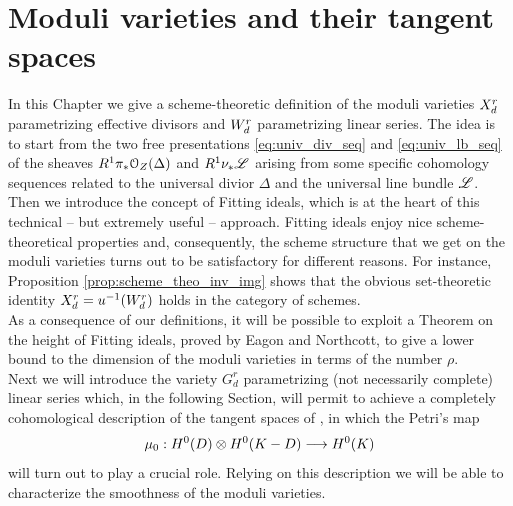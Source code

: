 
\chapter{Moduli varieties and their tangent spaces}\label{chap:moduli}



\ifpdf
    \graphicspath{{figures/PNG/}{figures/}{figures/}}
\else
    \graphicspath{{figures/EPS/}{figures/}}
\fi



In this Chapter we give a scheme-theoretic definition of the moduli varieties $X_d^r$ parametrizing effective divisors and $W_d^r$ parametrizing linear series. The idea is to start from the two free presentations \eqref{eq:univ_div_seq} and \eqref{eq:univ_lb_seq} of the sheaves $R^1 \pi_* \mathcal{O}_Z(\Delta)$ and $R^1 \nu_{*} \mathscr{L}$ arising from some specific cohomology sequences related to the universal divior $\Delta$ and the universal line bundle $\mathscr{L}$.\\
Then we introduce the concept of Fitting ideals, which is at the heart of this technical -- but extremely useful -- approach. Fitting ideals enjoy nice scheme-theoretical properties and, consequently, the scheme structure that we get on the moduli varieties turns out to be satisfactory for different reasons. For instance, Proposition \ref{prop:scheme_theo_inv_img} shows that the obvious set-theoretic identity $X_d^r = u^{-1}(W_d^r)$ holds in the category of schemes.\\
As a consequence of our definitions, it will be possible to exploit a Theorem on the height of Fitting ideals, proved by Eagon and Northcott, to give a lower bound to the dimension of the moduli varieties \moduu in terms of the \BN number $\rho$. \\
Next we will introduce the variety $G_d^r$ parametrizing (not necessarily complete) linear series which, in the following Section, will permit to achieve a completely cohomological description of the tangent spaces of \modu, in which the Petri's map 
$$ \mu_0: H^0(D)\otimes H^0(K-D) \longrightarrow H^0(K) $$ 
will turn out to play a crucial role. Relying on this description we will be able to characterize the smoothness of the moduli varieties.


